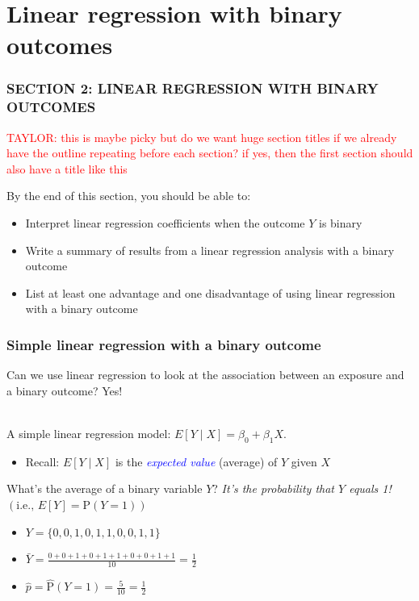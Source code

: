 \documentclass[10pt,t]{beamer}
\begin{document}
\section{Linear regression with binary outcomes}
\begin{frame}
	\frametitle{SECTION 2: LINEAR REGRESSION WITH BINARY OUTCOMES}
	\textcolor{red}{TAYLOR: this is maybe picky but do we want huge section titles if we already have the outline repeating before each section? if yes, then the first section should also have a title like this}
	
	By the end of this section, you should be able to:
	\begin{itemize}
		\item Interpret linear regression coefficients when the outcome $Y$ is binary
		\item Write a summary of results from a linear regression analysis with a binary outcome
		\item List at least one advantage and one disadvantage of using linear regression with a binary outcome
	\end{itemize}
\end{frame}
\begin{frame}
	\frametitle{Simple linear regression with a binary outcome}
	Can we use linear regression to look at the association between an exposure and a binary outcome? Yes!
	\\ ~\
	
	A simple linear regression model: $E[Y \mid X] = \beta_0 + \beta_1 X$.
	\begin{footnotesize}
		\begin{itemize}
			\item Recall: $E[Y \mid X]$ is the \textcolor{blue}{\textit{expected value}} (average) of $Y$ given $X$ 
		\end{itemize}
	\end{footnotesize}
	\pause
	What's the average of a binary variable $Y$? \pause \textit{It's the probability that $Y$ equals 1!} $\left(\text{i.e., } E[Y] = \text{P}(Y=1)\right)$ \pause
	
	\begin{itemize} \itemsep +12pt
		\item[] $Y = \{ 0, 0, 1, 0, 1, 1, 0, 0, 1, 1 \}$ \pause
		\item[] $\bar{Y} = \frac{0 + 0 + 1 + 0 + 1 + 1 + 0 + 0 + 1 + 1}{10} = \frac{1}{2}$ \pause
		\item[] $\hat{p} = \hat{\text{P}}(Y=1) = \frac{5}{10} = \frac{1}{2} $
	\end{itemize}
\end{frame}
\end{document}
